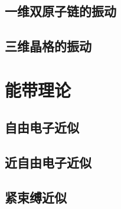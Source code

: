 \section{一维双原子链的振动}
\section{三维晶格的振动}

\chapter{能带理论}\label{chap:4}
\section{自由电子近似}
\section{近自由电子近似}
\section{紧束缚近似}